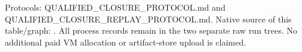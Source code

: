 \documentclass[10pt]{article}
\begin{document}
Protocols: QUALIFIED_CLOSURE_PROTOCOL.md and QUALIFIED_CLOSURE_REPLAY_PROTOCOL.md.
Native source of this table/graph:
.
All process records remain in the two separate raw run trees. No additional
paid VM allocation or artifact-store upload is claimed.
\end{document}
